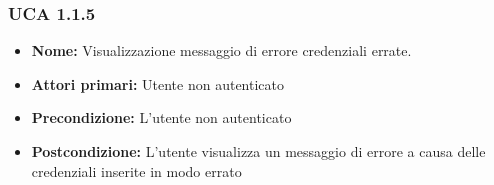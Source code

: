 \subsubsection{UCA 1.1.5}%
\begin{itemize}
\item \textbf{Nome:} Visualizzazione messaggio di errore credenziali errate.
\item \textbf{Attori primari:} Utente non autenticato
\item \textbf{Precondizione:}  L'utente non autenticato
\item \textbf{Postcondizione:} L'utente visualizza un messaggio di errore a causa delle credenziali inserite in modo errato
\end{itemize}

